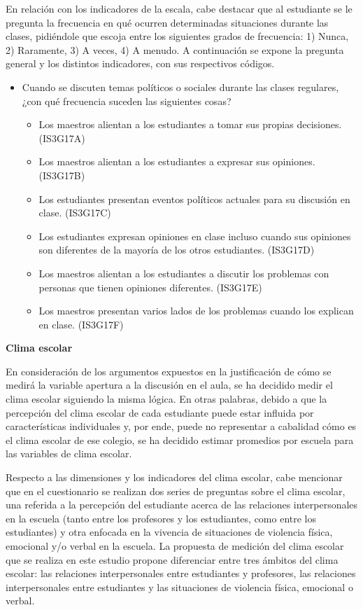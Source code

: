 \documentclass[12pt,twoside]{templates/facsothesis}
\providecommand{\tightlist}{%
  \setlength{\itemsep}{0pt}\setlength{\parskip}{0pt}}
\begin{document}
En relación con los indicadores de la escala, cabe destacar que al estudiante se le pregunta la frecuencia en qué ocurren determinadas situaciones durante las clases, pidiéndole que escoja entre los siguientes grados de frecuencia: 1) Nunca, 2) Raramente, 3) A veces, 4) A menudo. A continuación se expone la pregunta general y los distintos indicadores, con sus respectivos códigos.

\begin{itemize}
\item
  Cuando se discuten temas políticos o sociales durante las clases regulares, ¿con qué frecuencia suceden las siguientes cosas?

  \begin{itemize}
  \tightlist
  \item
    Los maestros alientan a los estudiantes a tomar sus propias decisiones. (IS3G17A)
  \item
    Los maestros alientan a los estudiantes a expresar sus opiniones. (IS3G17B)
  \item
    Los estudiantes presentan eventos políticos actuales para su discusión en clase. (IS3G17C)
  \item
    Los estudiantes expresan opiniones en clase incluso cuando sus opiniones son diferentes de la mayoría de los otros estudiantes. (IS3G17D)
  \item
    Los maestros alientan a los estudiantes a discutir los problemas con personas que tienen opiniones diferentes. (IS3G17E)
  \item
    Los maestros presentan varios lados de los problemas cuando los explican en clase. (IS3G17F)
  \end{itemize}
\end{itemize}

\textbf{Clima escolar}

En consideración de los argumentos expuestos en la justificación de cómo se medirá la variable apertura a la discusión en el aula, se ha decidido medir el clima escolar siguiendo la misma lógica. En otras palabras, debido a que la percepción del clima escolar de cada estudiante puede estar influida por características individuales y, por ende, puede no representar a cabalidad cómo es el clima escolar de ese colegio, se ha decidido estimar promedios por escuela para las variables de clima escolar.

Respecto a las dimensiones y los indicadores del clima escolar, cabe mencionar que en el cuestionario se realizan dos series de preguntas sobre el clima escolar, una referida a la percepción del estudiante acerca de las relaciones interpersonales en la escuela (tanto entre los profesores y los estudiantes, como entre los estudiantes) y otra enfocada en la vivencia de situaciones de violencia física, emocional y/o verbal en la escuela. La propuesta de medición del clima escolar que se realiza en este estudio propone diferenciar entre tres ámbitos del clima escolar: las relaciones interpersonales entre estudiantes y profesores, las relaciones interpersonales entre estudiantes y las situaciones de violencia física, emocional o verbal.
\end{document}
